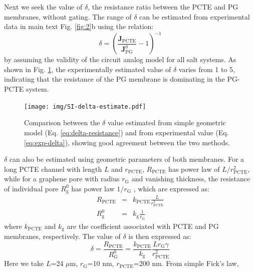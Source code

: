\documentclass[journal=langd5,email=true, hyperref=true, keywords=false]{achemso}
\begin{document}
Next we seek the value of $\delta$, the resistance ratio
between the PCTE and PG membranes, without gating. The range
of $\delta$ can be estimated from experimental data in main text
Fig. \ref{fig:2}b using the relation:
\begin{equation}
  \label{eq:exp-delta}
  \delta = \left(\frac{\boldsymbol{J}_{\mathrm{PCTE}}}{\boldsymbol{J}_{\mathrm{PG}}^{0}} -1 \right)^{-1}
\end{equation}
by assuming the validity of the circuit analog model for all salt
systems. As shown in Fig. \ref{fig:delta-compare}, the
experimentally estimated value of $\delta$ varies from 1 to 5,
indicating that the resistance of the PG membrane is dominating in the
PG-PCTE system.
\begin{figure}[htbp]
  \centering
  \texttt{[image: img/SI-delta-estimate.pdf]}
  \caption{Comparison between the $\delta$ value estimated from simple
    geometric model (Eq. \ref{eq:delta-resistance}) and from
    experimental value (Eq. \ref{eq:exp-delta}), showing good
    agreement between the two methods.  }
  \label{fig:delta-compare}
\end{figure}
$\delta$ can also be estimated using geometric parameters of both
membranes. For a long PCTE channel with length $L$ and
$r_{\mathrm{PCTE}}$, $R_{\mathrm{PCTE}}$ has power law of
$L/r_{\mathrm{PCTE}}^{2}$, while for a graphene pore
with radius $r_{\mathrm{G}}$ and vanishing thickness, the resistance of individual pore $R_{\mathrm{g}}^{0}$
has power law $1/r_{\mathrm{G}}$ \cite{O_Hern_2014}, which are expressed as:
\begin{subequations}
\begin{eqnarray}
  \label{eq:R-both}
  R_{\mathrm{PCTE}} &= &k_{\mathrm{PCTE}} \frac{L}{r_{\mathrm{PCTE}}^{2}} \\
  R_{\mathrm{g}}^{0} &= &k_{\mathrm{g}} \frac{1}{r_{\mathrm{G}}}
\end{eqnarray}
\end{subequations}
where $k_{\mathrm{PCTE}}$ and $k_{\mathrm{g}}$ are the coefficient
associated with PCTE and PG membranes, respectively. The value of
$\delta$ is then expressed as:
\begin{equation}
  \label{eq:delta-resistance}
  \delta
  = \frac{R_{\mathrm{PCTE}}}{R_{\mathrm{G}}^{0}}
  = {\displaystyle
    \frac{k_{\mathrm{PCTE}}}{k_{\mathrm{g}}}
    \frac{L r_{\mathrm{G}} \gamma}
        {r_{\mathrm{PCTE}}^{2}}}
\end{equation}
Here we take $L$=24 $\mu$m, $r_{\mathrm{G}}$=10 nm,
$r_{\mathrm{PCTE}}$=200 nm. From simple Fick's law,
\end{document}
